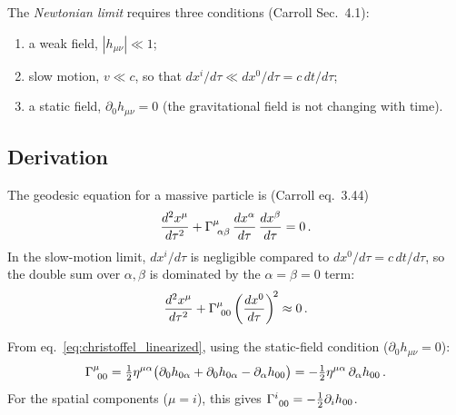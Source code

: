 The \emph{Newtonian limit} requires three conditions
(Carroll Sec.~4.1):
\begin{enumerate}
    \item a weak field, $|h_{\mu\nu}| \ll 1$;
    \item slow motion, $v \ll c$, so that
          $dx^i/d\tau \ll dx^0/d\tau = c\,dt/d\tau$;
    \item a static field, $\partial_0 h_{\mu\nu} = 0$
          (the gravitational field is not changing with time).
\end{enumerate}

\subsection{Derivation}

The geodesic equation for a massive particle is (Carroll eq.~3.44)
\begin{equation}
    \frac{d^2 x^\mu}{d\tau^2}
    + \Gamma^{\mu}_{\ \alpha \beta}\,
    \frac{dx^\alpha}{d\tau}\, \frac{dx^\beta}{d\tau} = 0 \,.
    \label{eq:geodesic_full}
\end{equation}
In the slow-motion limit, $dx^i/d\tau$ is negligible compared to
$dx^0/d\tau = c\,dt/d\tau$, so the double sum over $\alpha, \beta$
is dominated by the $\alpha = \beta = 0$ term:
\begin{equation}
    \frac{d^2 x^\mu}{d\tau^2}
    + \Gamma^{\mu}_{\ 0 0}\left(\frac{dx^0}{d\tau}\right)^{\!2}
    \approx 0 \,.
    \label{eq:geodesic_slow}
\end{equation}

From eq.~\eqref{eq:christoffel_linearized}, using the static-field
condition ($\partial_0 h_{\mu\nu} = 0$):
\begin{equation}
    \Gamma^{\mu}_{\ 0 0}
    = \tfrac{1}{2} \eta^{\mu\alpha}\bigl(
    \partial_0 h_{0\alpha} + \partial_0 h_{0\alpha}
    - \partial_\alpha h_{00}\bigr)
    = -\tfrac{1}{2} \eta^{\mu\alpha}\, \partial_\alpha h_{00} \,.
    \label{eq:gamma_00}
\end{equation}
For the spatial components ($\mu = i$), this gives
$\Gamma^{i}_{\ 0 0} = -\tfrac{1}{2} \partial_i h_{00}$.

